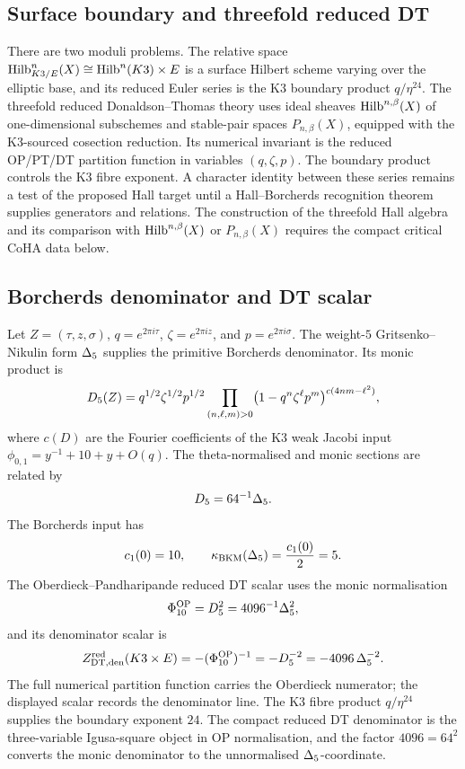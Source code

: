 \subsection*{Surface boundary and threefold reduced DT}

There are two moduli problems.  The relative space
\(\mathrm{Hilb}^{n}_{K3/E}(X)\cong \mathrm{Hilb}^{n}(K3)\times E\) is a surface
Hilbert scheme varying over the elliptic base, and its reduced Euler
series is the K3 boundary product \(q/\eta^{24}\).  The threefold
reduced Donaldson--Thomas theory uses ideal sheaves
\(\mathrm{Hilb}^{n,\beta}(X)\) of one-dimensional subschemes and stable-pair
spaces \(P_{n,\beta}(X)\), equipped with the K3-sourced cosection
reduction.  Its numerical invariant is the reduced OP/PT/DT partition
function in variables \((q,\zeta,p)\).  The boundary product controls
the K3 fibre exponent.  A character identity between these series remains
a test of the proposed Hall target until a Hall--Borcherds recognition
theorem supplies generators and relations.  The construction of the
threefold Hall algebra and its comparison with
\(\mathrm{Hilb}^{n,\beta}(X)\) or \(P_{n,\beta}(X)\) requires the compact
critical CoHA data below.

\subsection*{Borcherds denominator and DT scalar}

Let \(Z=(\tau,z,\sigma)\), \(q=e^{2\pi i\tau}\),
\(\zeta=e^{2\pi iz}\), and \(p=e^{2\pi i\sigma}\).  The weight-\(5\)
Gritsenko--Nikulin form \(\Delta_5\) supplies the primitive Borcherds
denominator.  Its monic product is
\[
  D_5(Z)
  =
  q^{1/2}\zeta^{1/2}p^{1/2}
  \prod_{(n,\ell,m)>0}
  \bigl(1-q^n\zeta^\ell p^m\bigr)^{c(4nm-\ell^2)},
\]
where \(c(D)\) are the Fourier coefficients of the K3 weak Jacobi input
\(\phi_{0,1}=y^{-1}+10+y+O(q)\).  The theta-normalised and monic
sections are related by
\[
  D_5=64^{-1}\Delta_5.
\]
The Borcherds input has
\[
  c_1(0)=10,\qquad
  \kappa_{\mathrm{BKM}}(\Delta_5)=\frac{c_1(0)}{2}=5.
\]
The Oberdieck--Pandharipande reduced DT scalar uses the monic
normalisation
\[
  \Phi_{10}^{\mathrm{OP}}=D_5^2=4096^{-1}\Delta_5^2,
\]
and its denominator scalar is
\[
  Z^{\mathrm{red}}_{\mathrm{DT},\mathrm{den}}(K3\times E)
  = -(\Phi_{10}^{\mathrm{OP}})^{-1}
  = -D_5^{-2}
  = -4096\,\Delta_5^{-2}.
\]
The full numerical partition function carries the Oberdieck numerator;
the displayed scalar records the denominator line.  The K3 fibre
product \(q/\eta^{24}\) supplies the boundary exponent \(24\).  The
compact reduced DT denominator is the three-variable Igusa-square object
in OP normalisation, and the factor \(4096=64^2\) converts the monic
denominator to the unnormalised \(\Delta_5\)-coordinate.

